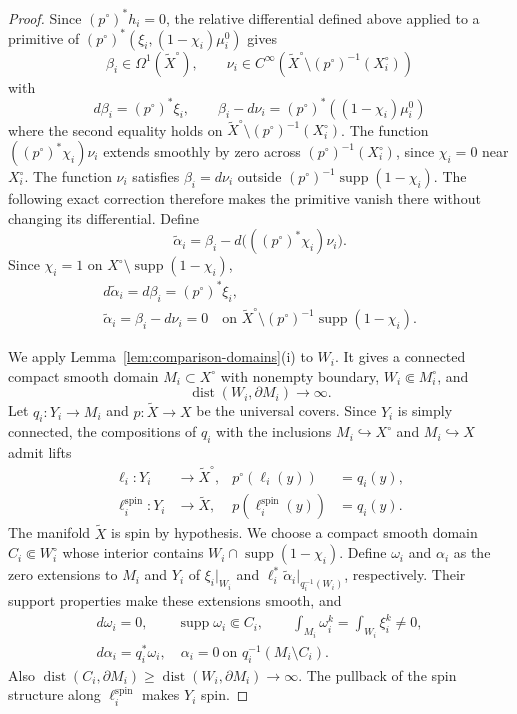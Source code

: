 \documentclass[12pt,reqno]{amsart}
\numberwithin{equation}{section}
\theoremstyle{definition}
\newcommand{\supp}{\operatorname{supp}}
\newcommand{\dist}{\operatorname{dist}}
\begin{document}
\begin{proof}
Since $(p^\circ)^*h_i=0$, the relative differential defined above
applied to a primitive of
$(p^\circ)^*(\xi_i,(1-\chi_i)\mu_i^0)$ gives
\[
 \beta_i\in\Omega^1(\widetilde X^\circ),\qquad
 \nu_i\in C^\infty\!\left(
 \widetilde X^\circ\setminus(p^\circ)^{-1}(X_i^\circ)\right)
\]
with
\[
 d\beta_i=(p^\circ)^*\xi_i,
 \qquad
 \beta_i-d\nu_i=(p^\circ)^*((1-\chi_i)\mu_i^0)
\]
where the second equality holds on
$\widetilde X^\circ\setminus(p^\circ)^{-1}(X_i^\circ)$.
The function $((p^\circ)^*\chi_i)\nu_i$ extends smoothly by zero
across $(p^\circ)^{-1}(X_i^\circ)$, since $\chi_i=0$ near
$X_i^\circ$. The function $\nu_i$ satisfies
$\beta_i=d\nu_i$ outside $(p^\circ)^{-1}\supp(1-\chi_i)$. The
following exact correction therefore makes the primitive vanish
there without changing its differential.   Define
\[
 \widetilde\alpha_i
 =\beta_i-d\bigl(((p^\circ)^*\chi_i)\nu_i\bigr).
\]
Since $\chi_i=1$ on $X^\circ\setminus\supp(1-\chi_i)$,
\begin{equation}\label{eq:H-beta}
 \begin{gathered}
 d\widetilde\alpha_i=d\beta_i=(p^\circ)^*\xi_i,\\
 \widetilde\alpha_i=\beta_i-d\nu_i=0
 \quad\text{on }
 \widetilde X^\circ\setminus(p^\circ)^{-1}\supp(1-\chi_i).
 \end{gathered}
\end{equation}

We apply Lemma~\ref{lem:comparison-domains}\textup{(i)} to $W_i$.  It
gives a connected compact smooth domain $M_i\subset X^\circ$ with
nonempty boundary, $W_i\Subset M_i^\circ$, and
\[
 \dist(W_i,\partial M_i)\longrightarrow\infty.
\]
Let $q_i:Y_i\to M_i$ and $p:\widetilde X\to X$ be the universal
covers.  Since $Y_i$ is simply connected, the compositions of $q_i$
with the inclusions $M_i\hookrightarrow X^\circ$ and
$M_i\hookrightarrow X$ admit lifts
\[
 \begin{aligned}
 \ell_i:Y_i&\longrightarrow\widetilde X^\circ,
 & p^\circ(\ell_i(y))&=q_i(y),\\
 \ell_i^{\mathrm{spin}}:Y_i&\longrightarrow\widetilde X,
 & p(\ell_i^{\mathrm{spin}}(y))&=q_i(y).
 \end{aligned}
\]
The manifold $\widetilde X$ is spin by hypothesis.
We choose a compact smooth domain $C_i\Subset W_i^\circ$ whose interior
contains $W_i\cap\supp(1-\chi_i)$.
Define $\omega_i$ and $\alpha_i$ as the zero extensions to $M_i$
and $Y_i$ of $\xi_i|_{W_i}$ and
$\ell_i^*\widetilde\alpha_i|_{q_i^{-1}(W_i)}$, respectively.
Their support properties make these extensions smooth, and
\[
\begin{gathered}
 d\omega_i=0,
 \qquad \supp\omega_i\Subset C_i,
 \qquad \int_{M_i}\omega_i^k=\int_{W_i}\xi_i^k\ne0,\\
 d\alpha_i=q_i^*\omega_i,
 \quad \alpha_i=0\ \text{on }q_i^{-1}(M_i\setminus C_i).
\end{gathered}
\]
Also
$\dist(C_i,\partial M_i)\geq\dist(W_i,\partial M_i)\to\infty$.
The pullback of the spin structure along $\ell_i^{\mathrm{spin}}$
makes $Y_i$ spin.
\end{proof}
\end{document}

